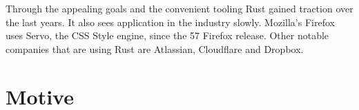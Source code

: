 \documentclass[thesis]{subfiles}
\begin{document}
    Through the appealing goals and the convenient tooling Rust gained traction over the last years.\autocites{sosurvey}{rustorg}{rust3}
    It also sees application in the industry slowly.
    Mozilla's Firefox uses Servo, the CSS Style engine, since the 57 Firefox release.\autocite{servo}
    Other notable companies that are using Rust are Atlassian, Cloudflare
    and Dropbox.\autocite{rustorg}


\section{Motive}
\end{document}
